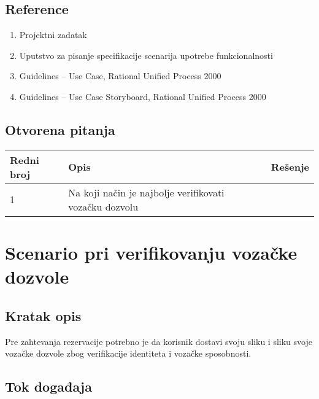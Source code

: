 \documentclass[12pt]{article}
\begin{document}
\subsection{Reference}
\begin{enumerate}
   \item Projektni zadatak
   \item Uputstvo za pisanje specifikacije scenarija upotrebe funkcionalnosti
   \item  Guidelines – Use Case, Rational Unified Process 2000
   \item  Guidelines – Use Case Storyboard, Rational Unified Process 2000
 \end{enumerate}
\subsection{Otvorena pitanja}


\begin{center}
\begin{tabular}{ | m{2cm} | m{7cm}| m{7cm} | } 
\hline
Redni broj& Opis & Rešenje \\ 
\hline
1 & Na koji način je najbolje verifikovati vozačku dozvolu & \\ 
\hline
\end{tabular}
\end{center}

    

\section{Scenario pri verifikovanju vozačke dozvole}
\subsection{Kratak opis}
Pre zahtevanja rezervacije potrebno je da korisnik dostavi svoju sliku i sliku svoje
vozačke dozvole zbog verifikacije identiteta i vozačke sposobnosti.
\subsection{Tok događaja}
\end{document}
